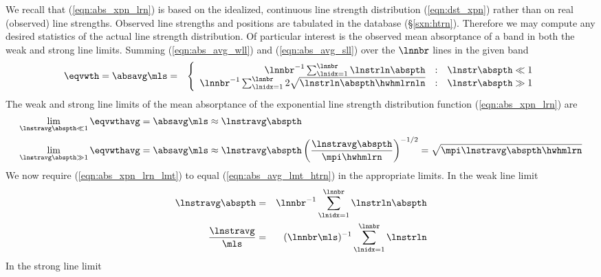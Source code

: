 \documentclass[12pt]{article}
\begin{document}
We recall that (\ref{eqn:abs_xpn_lrn}) is based on the idealized,
continuous line strength distribution (\ref{eqn:dst_xpn}) rather than
on real (observed) line strengths.
Observed line strengths and positions are tabulated in the
 database (\S\ref{sxn:htrn}).
Therefore we may compute any desired statistics of the actual line
strength distribution.
Of particular interest is the observed mean absorptance of a band
in both the weak and strong line limits.
Summing (\ref{eqn:abs_avg_wll}) and (\ref{eqn:abs_avg_sll}) over
the $\lnnbr$ lines in the given band
\begin{eqnarray}
\eqvwth = \absavg \mls & = & \left\{
\begin{array}{r@{\quad:\quad}ll}
\lnnbr^{-1} \sum_{\lnidx = 1}^{\lnnbr} \lnstrln \abspth
& \lnstr \abspth \ll 1 \\
\lnnbr^{-1} \sum_{\lnidx = 1}^{\lnnbr} 2 \sqrt{ \lnstrln \abspth \hwhmlrnln } 
& \lnstr \abspth \gg 1
\end{array} \right.
\label{eqn:abs_avg_lmt_htrn}
\end{eqnarray}
The weak and strong line limits of the mean absorptance of the 
exponential line strength distribution function
(\ref{eqn:abs_xpn_lrn}) are
\begin{subequations}
\label{eqn:abs_xpn_lrn_lmt}
\begin{align}
\label{eqn:abs_xpn_lrn_wll}
\lim_{\lnstravg \abspth \ll 1} \eqvwthavg = \absavg \mls & \approx 
\lnstravg \abspth \\
\label{eqn:abs_xpn_lrn_sll}
\lim_{\lnstravg \abspth \gg 1} \eqvwthavg = \absavg \mls & \approx 
\lnstravg \abspth
\left(\frac{\lnstravg \abspth}{\mpi \hwhmlrn} \right)^{-1/2}
= \sqrt{ \mpi \lnstravg \abspth \hwhmlrn }
\end{align}
\end{subequations}
We now require (\ref{eqn:abs_xpn_lrn_lmt}) to equal
(\ref{eqn:abs_avg_lmt_htrn}) in the appropriate limits.
In the weak line limit
\begin{eqnarray}
\lnstravg \abspth & = & 
\lnnbr^{-1} \sum_{\lnidx = 1}^{\lnnbr} \lnstrln \abspth \nonumber \\
\frac{\lnstravg}{\mls}
& = & 
(\lnnbr\mls)^{-1} \sum_{\lnidx = 1}^{\lnnbr} \lnstrln
\end{eqnarray}
In the strong line limit
\end{document}
